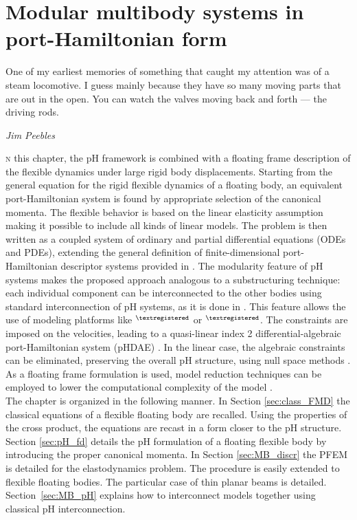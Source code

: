 \chapter{Modular multibody systems in port-Hamiltonian form}

\epigraph{One of my earliest memories of something that caught my attention was of a steam locomotive. I guess mainly because they have so many moving parts that are out in the open. You can watch the valves moving back and forth — the driving rods.}{\textit{Jim Peebles}}

\minitoc

\lettrine{\color{theme}{I}}n this chapter, the pH framework is combined with a floating frame description of the flexible dynamics under large rigid body displacements. Starting from the general equation for the rigid flexible dynamics of a floating body, an equivalent port-Hamiltonian system is found by appropriate selection of the canonical momenta. The flexible behavior is based on the linear elasticity assumption making it possible to include all kinds of linear models. The problem is then written as a coupled system of ordinary and partial differential equations (ODEs and PDEs), extending the general definition of finite-dimensional port-Hamiltonian descriptor systems provided in \cite{mehrmann2019structurepreserving}. The modularity feature of pH systems makes the proposed approach analogous to a substructuring technique: each individual component can be interconnected to the other bodies using standard interconnection of pH systems, as it is done in \cite{macchelli2007link}. This feature allows the use of modeling platforms like {}$^{\tiny{\textregistered}}$ or {}$^{\tiny{\textregistered}}$.  The constraints are imposed on the velocities, leading to a quasi-linear index 2 differential-algebraic port-Hamiltonian system (pHDAE) \cite{steinbrecher2006phd,beattie2018linear}. In the linear case, the algebraic constraints can be eliminated, preserving the overall pH structure, using null space methods \cite{leyendecker2008nullspace}.  As a floating frame formulation is used, model reduction techniques can be employed to lower the computational complexity of the model \cite{chaturantabut2016,egger2018}.  \\


\indent The chapter is organized in the following manner. In Section \ref{sec:class_FMD} the classical equations of a flexible floating body are recalled. Using the properties of the cross product, the equations are recast in a form closer to the pH structure. Section \ref{sec:pH_fd} details the pH formulation of a floating flexible body by introducing the proper canonical momenta. In Section \ref{sec:MB_discr} the PFEM is detailed for the elastodynamics problem. The procedure is easily extended to flexible floating bodies. The particular case of thin planar beams is detailed. Section~\ref{sec:MB_pH} explains how to interconnect models together using classical pH interconnection. 

